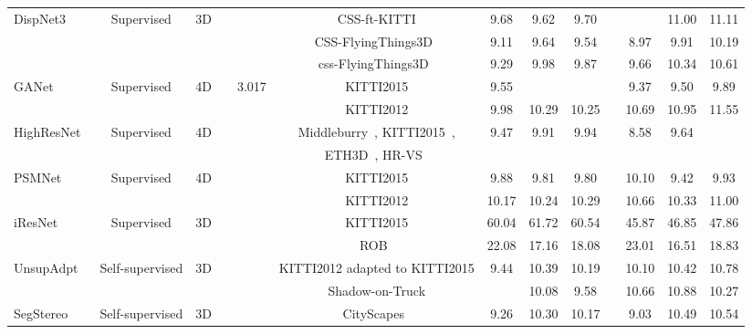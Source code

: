 \documentclass[10pt,journal,compsoc]{IEEEtran}
\begin{document}
\begin{table*}[t]
{\begin{tabular}{@{}l c @{ }ccc@{}c@{ }c ccc@{}ccc@{}}
	DispNet3~\cite{Ilg_2018_ECCV}  &Supervised & 3D  &  &   & CSS-ft-KITTI & 9.68	&9.62	&9.70& &		&11.00	&11.11\\
	\cline{6-13}
							  &  &    &   &	   & CSS-FlyingThings3D~\cite{mayer2016large} & 9.11	&9.64&	9.54	& & 8.97	&9.91	&10.19 \\
							  \cline{6-13}
							  &   &   &   &	   & css-FlyingThings3D~\cite{mayer2016large} &  9.29	&9.98&	9.87	& & 9.66	&10.34	&10.61 \\
	\cline{1-13}
	GANet~\cite{zhang2019ga}  &  Supervised & 4D &   &	3.017  & KITTI2015 & 9.55	& 	&  &	&9.37&	9.50	&9.89  \\ 
	\cline{6-13}
							 &    & &   &	   & KITTI2012 &  9.98	&10.29&	10.25 & &10.69&	10.95&	11.55\\
	\cline{1-13}
	HighResNet~\cite{Yang_2019_CVPR} &  Supervised & 4D &   &	  & Middleburry~\cite{scharstein2014high}, KITTI2015~\cite{menze2015object}, & 9.47&	9.91&	9.94	 & &8.58&	9.64	&  \\
								  &  & & &  &  ETH3D~\cite{schops2017multi}, HR-VS~\cite{Yang_2019_CVPR}& \\
	\cline{1-13}
	PSMNet~\cite{chang2018pyramid}    & Supervised &  4D &  	&   & KITTI2015& 9.88	&9.81&	9.80	& &10.10&	9.42	&9.93\\ \cline{6-13}
								&     & &   &	   & KITTI2012 &  10.17	&10.24	&10.29&	& 10.66&	10.33	&11.00\\
	\cline{1-13}
	iResNet~\cite{liang2018learning}  & Supervised &  3D &   &  & KITTI2015 & 60.04	&61.72	&60.54& &45.87	&46.85 & 47.86\\
	\cline{6-13}
							&   &   &   &	   & ROB~\cite{rob} &  22.08	&17.16	&18.08& &	23.01	&16.51	&18.83\\
	\cline{1-13}
	UnsupAdpt~\cite{tonioni2017unsupervised}   &   Self-supervised & 3D &   &  & KITTI2012 adapted to KITTI2015 & 9.44	&10.39&	10.19 & &10.10&	10.42&	10.78\\
	\cline{6-13}
									     &    &  &   &	   & Shadow-on-Truck & &	10.08	&9.58 & &10.66&	10.88&	10.27\\
	\cline{1-13}
	SegStereo~\cite{yang2018segstereo}  & Self-supervised &  3D   &  &   & CityScapes~\cite{cordts2016cityscapes} & 9.26&	10.30	&10.17& &9.03	&10.49&	10.54\\
	\bottomrule
	


	
\end{tabular}
}		
\end{table*}
\end{document}
